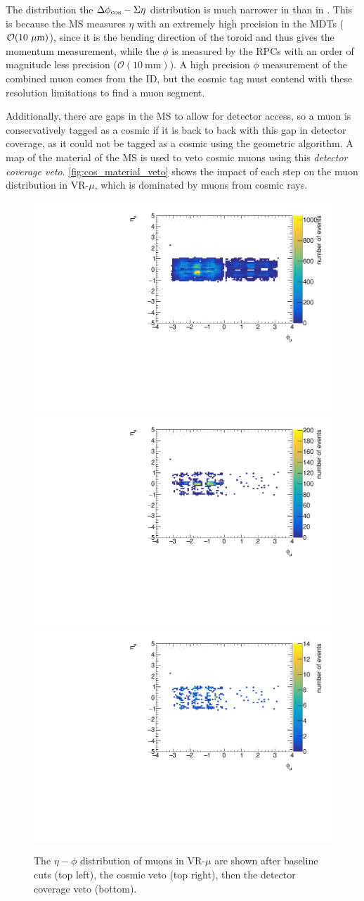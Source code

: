 The distribution the $\Delta \phi_{\text{cos}}-\Sigma \eta$ distribution is much narrower in \sigeta than in \dphicos. This is because the \ac{MS} measures $\eta$ with an extremely high precision in the \acp{MDT} ($\mathcal{O}(10~\mu\text{m})$), since it is the bending direction of the toroid and thus gives the momentum measurement, while the $\phi$ is measured by the \acp{RPC} with an order of magnitude less precision ($\mathcal{O}(10~\text{mm})$). A high precision $\phi$ measurement of the combined muon comes from the \ac{ID}, but the cosmic tag must contend with these resolution limitations to find a muon segment.

Additionally, there are gaps in the \ac{MS} to allow for detector access, so a muon is conservatively tagged as a cosmic if it is back to back with this gap in detector coverage, as it could not be tagged as a cosmic using the geometric algorithm. A map of the material of the \ac{MS} is used to veto cosmic muons using this \emph{detector coverage veto}. \autoref{fig:cos_material_veto} shows the impact of each step on the muon distribution in VR-$\mu$, which is dominated by muons from cosmic rays.


\begin{figure}[!ht]
\centering
\includegraphics[width=.48\textwidth]{figures/cosmics/v4_widetag_2_eta_phi_baseline.pdf}
\includegraphics[width=.48\textwidth]{figures/cosmics/v4_widetag_2_eta_phi_costag.pdf}
\includegraphics[width=.48\textwidth]{figures/cosmics/v4_widetag_2_eta_phi_costag_mv.pdf}
\caption{The $\eta-\phi$ distribution of muons in VR-$\mu$ are shown after baseline cuts (top left), the cosmic veto (top right), then the detector coverage veto (bottom).}
\label{fig:cos_material_veto}
\end{figure}

